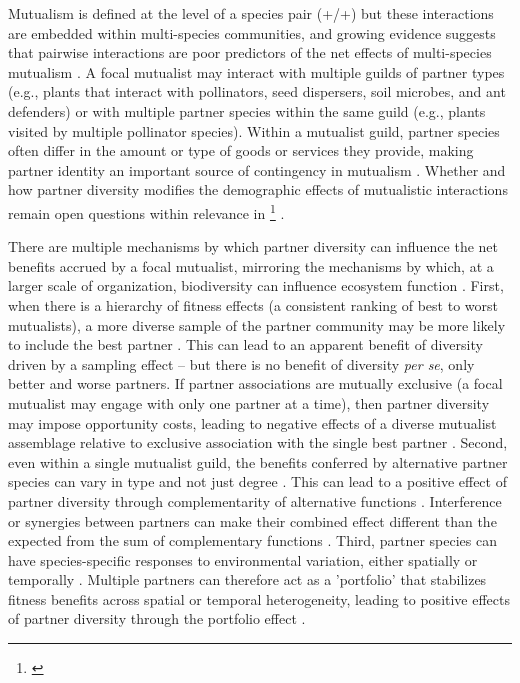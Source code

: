 \documentclass[11pt]{article}
\newcommand{\tom}[2]{{\color{red}{#1}}\footnote{\textit{\color{red}{#2}}}}
\begin{document}
Mutualism is defined at the level of a species pair (+/+) but these interactions are embedded within multi-species communities, and growing evidence suggests that pairwise interactions are poor predictors of the net effects of multi-species mutualism \citep{Afkhami2014,Palmer2010,Bascompte2009,Dattilo2014}. 
A focal mutualist may interact with multiple guilds of partner types (e.g., plants that interact with pollinators, seed dispersers, soil microbes, and ant defenders) or with multiple partner species within the same guild (e.g., plants visited by multiple pollinator species). 
Within a mutualist guild, partner species often differ in the amount or type of goods or services they provide, making partner identity an important source of contingency in mutualism \citep{Stanton2003}. 
Whether and how partner diversity modifies the demographic effects of mutualistic interactions remain open questions within relevance in \tom{applied settings}{would be good if you could find another applied example to cite here} \citep{rogers2014}.

There are multiple mechanisms by which partner diversity can influence the net benefits accrued by a focal mutualist, mirroring the mechanisms by which, at a larger scale of organization, biodiversity can influence ecosystem function \cite{Yeung2006,Barrett2015,Ushio2020}. 
First, when there is a hierarchy of fitness effects (a consistent ranking of best to worst mutualists), a more diverse sample of the partner community may be more likely to include the best partner \cite{Frederickson2013}.
This can lead to an apparent benefit of diversity driven by a sampling effect \cite{Batstone2018} -- but there is no benefit of diversity \emph{per se}, only better and worse partners. 
If partner associations are mutually exclusive (a focal mutualist may engage with only one partner at a time), then partner diversity may impose opportunity costs, leading to negative effects of a diverse mutualist assemblage relative to exclusive association with the single best partner \citep{Miller2007}. 
Second, even within a single mutualist guild, the benefits conferred by alternative partner species can vary in type and not just degree \cite{Stachowicz2005,Bronstein2006,Stanton2003}. 
This can lead to a positive effect of partner diversity through complementarity of alternative functions \cite{Batstone2018}. 
Interference or synergies between partners can make their combined effect different than the expected from the sum of complementary functions \cite{Afkhami2014}. 
Third, partner species can have species-specific responses to environmental variation, either spatially \citep{Ollerton2006} or temporally \citep{Alarcon2008}. 
Multiple partners can therefore act as a 'portfolio' that stabilizes fitness benefits across spatial or temporal heterogeneity, leading to positive effects of partner diversity through the portfolio effect \cite{Batstone2018,Lazaro2022,Horvitz1990}. 
\end{document}
